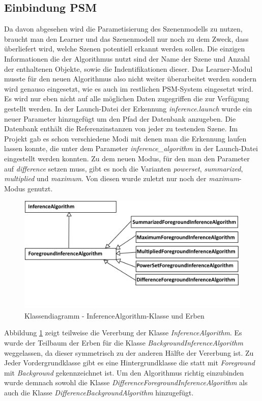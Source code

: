 \subsection{Einbindung PSM}
Da davon abgesehen wird die Parametisierung des Szenenmodells zu nutzen, braucht man den Learner und das Szenenmodell nur noch zu dem Zweck, dass überliefert wird, welche Szenen potentiell erkannt werden sollen. Die einzigen Informationen die der Algorithmus nutzt sind der Name der Szene und Anzahl der enthaltenen Objekte, sowie die Indentifikationen dieser. Das Learner-Modul musste für den neuen Algorithmus also nicht weiter überarbeitet werden sondern wird genauso eingesetzt, wie es auch im restlichen PSM-System eingesetzt wird. Es wird nur eben nicht auf alle möglichen Daten zugegriffen die zur Verfügung gestellt werden.
In der Launch-Datei der Erkennung \textit{inference.launch} wurde ein neuer Parameter hinzugefügt um den Pfad der Datenbank anzugeben. Die Datenbank enthält die Referenzinstanzen von jeder zu testenden Szene. Im Projekt gab es schon verschiedene Modi mit denen man die Erkennung laufen lassen konnte, die unter dem Parameter \textit{inference\_algorithm} in der Launch-Datei eingestellt werden konnten. Zu dem neuen Modus, für den man den Parameter auf \textit{difference} setzen muss, gibt es noch die Varianten \textit{powerset}, \textit{summarized}, \textit{multiplied} und \textit{maximum}. Von diesen wurde zuletzt nur noch der \textit{maximum}-Modus genutzt.\smallskip\\
\begin{figure}
	\centering
	\includegraphics[width=14cm]{bilder/inferenceAlgorithm.pdf}
	\caption{Klassendiagramm - InferenceAlgorithm-Klasse und Erben}
	\label{img:vererbung}
\end{figure}
Abbildung \ref{img:vererbung} zeigt teilweise die Vererbung der Klasse \textit{InferenceAlgorithm}. Es wurde der Teilbaum der Erben für die Klasse \textit{BackgroundInferenceAlgorithm} weggelassen, da dieser symmetrisch zu der anderen Hälfte der Vererbung ist. Zu Jeder Vordergrundklasse gibt es eine Hintergrundklasse die statt mit \textit{Foreground} mit \textit{Background} gekennzeichnet ist. Um den Algorithmus richtig einzubinden wurde demnach sowohl die Klasse \textit{DifferenceForegroundInferenceAlgorithm} als auch die Klasse \textit{DifferenceBackgroundAlgorithm} hinzugefügt.

